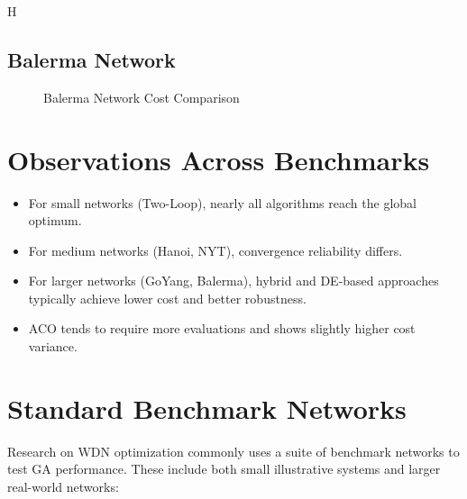 H\documentclass[12pt, a4paper]{article}
\begin{document}
\subsection{Balerma Network}

\begin{figure}[H]
\centering
{}
\caption{Balerma Network Cost Comparison}
\end{figure}


\section{Observations Across Benchmarks}

\begin{itemize}
    \item For small networks (Two-Loop), nearly all algorithms reach the global optimum.
    \item For medium networks (Hanoi, NYT), convergence reliability differs.
    \item For larger networks (GoYang, Balerma), hybrid and DE-based approaches
          typically achieve lower cost and better robustness.
    \item ACO tends to require more evaluations and shows slightly higher cost variance.
\end{itemize}


\section*{Standard Benchmark Networks}
Research on WDN optimization commonly uses a suite of benchmark networks to test GA performance. These include both small illustrative systems and larger real-world networks:
\end{document}
